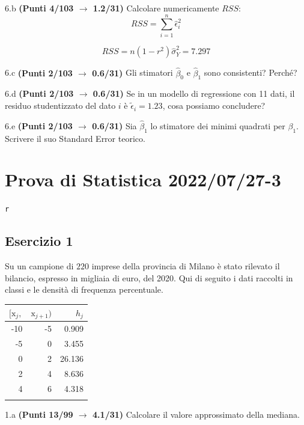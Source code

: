\documentclass[
  11pt,
]{book}
\theoremstyle{mytheoremstyle}
\theoremstyle{mydefstyle}
\newenvironment{sol}
  {
  \begin{tcolorbox}[enhanced,breakable,arc=0.1mm,boxrule=1pt,colback=white,colframe=iblue,
  title=\bf \fontfamily{lmss}\selectfont \hspace{.5 cm} Soluzione,drop fuzzy shadow]

}{
\end{tcolorbox}
  }
\begin{document}
6.b \textbf{(Punti 4/103 \(\rightarrow\) 1.2/31)} Calcolare numericamente \(RSS\):
\[
RSS=\sum_{i=1}^n \hat\epsilon_i^2
\]

\begin{sol}
\[RSS=n(1-r^2)\hat\sigma_Y^2=7.297\]

\end{sol}

6.c \textbf{(Punti 2/103 \(\rightarrow\) 0.6/31)} Gli stimatori \(\hat\beta_0\) e \(\hat\beta_1\) sono consistenti?
Perché?

6.d \textbf{(Punti 2/103 \(\rightarrow\) 0.6/31)} Se in un modello di regressione con 11 dati,
il residuo studentizzato del dato \(i\) è \(\tilde \epsilon_i=1.23\), cosa possiamo concludere?

6.e \textbf{(Punti 2/103 \(\rightarrow\) 0.6/31)} Sia \(\hat\beta_1\) lo stimatore dei minimi quadrati per \(\beta_1\).
Scrivere il suo Standard Error teorico.

\section{Prova di Statistica 2022/07/27-3}\label{prova-di-statistica-20220727-3}

\texttt{r}

\subsection{Esercizio 1}\label{esercizio-1-18}

Su un campione di \(220\) imprese della provincia di Milano è stato
rilevato il bilancio, espresso in migliaia di euro, del 2020. Qui di seguito i dati raccolti in classi
e le densità di frequenza percentuale.

\begin{table}[H]
\centering
\begin{tabular}{rrr}
\toprule
$[\text{x}_j,$ & $\text{x}_{j+1})$ & $h_j$\\
\midrule
-10 & -5 & 0.909\\
-5 & 0 & 3.455\\
0 & 2 & 26.136\\
2 & 4 & 8.636\\
4 & 6 & 4.318\\
 &  & \\
\bottomrule
\end{tabular}
\end{table}

1.a \textbf{(Punti 13/99 \(\rightarrow\) 4.1/31)} Calcolare il valore approssimato della mediana.
\end{document}

